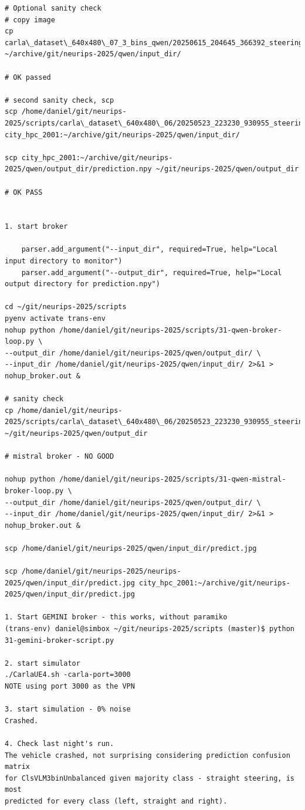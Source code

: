 \begin{verbatim}
# Optional sanity check
# copy image
cp carla\_dataset\_640x480\_07_3_bins_qwen/20250615_204645_366392_steering_0.0000.jpg ~/archive/git/neurips-2025/qwen/input_dir/

# OK passed

# second sanity check, scp
scp /home/daniel/git/neurips-2025/scripts/carla\_dataset\_640x480\_06/20250523_223230_930955_steering_0.0000.jpg city_hpc_2001:~/archive/git/neurips-2025/qwen/input_dir/

scp city_hpc_2001:~/archive/git/neurips-2025/qwen/output_dir/prediction.npy ~/git/neurips-2025/qwen/output_dir

# OK PASS


1. start broker

    parser.add_argument("--input_dir", required=True, help="Local input directory to monitor")
    parser.add_argument("--output_dir", required=True, help="Local output directory for prediction.npy")

cd ~/git/neurips-2025/scripts
pyenv activate trans-env
nohup python /home/daniel/git/neurips-2025/scripts/31-qwen-broker-loop.py \
--output_dir /home/daniel/git/neurips-2025/qwen/output_dir/ \
--input_dir /home/daniel/git/neurips-2025/qwen/input_dir/ 2>&1 > nohup_broker.out &

# sanity check
cp /home/daniel/git/neurips-2025/scripts/carla\_dataset\_640x480\_06/20250523_223230_930955_steering_0.0000.jpg ~/git/neurips-2025/qwen/output_dir

# mistral broker - NO GOOD

nohup python /home/daniel/git/neurips-2025/scripts/31-qwen-mistral-broker-loop.py \
--output_dir /home/daniel/git/neurips-2025/qwen/output_dir/ \
--input_dir /home/daniel/git/neurips-2025/qwen/input_dir/ 2>&1 > nohup_broker.out &

scp /home/daniel/git/neurips-2025/qwen/input_dir/predict.jpg

scp /home/daniel/git/neurips-2025/neurips-2025/qwen/input_dir/predict.jpg city_hpc_2001:~/archive/git/neurips-2025/qwen/input_dir/predict.jpg

1. Start GEMINI broker - this works, without paramiko
(trans-env) daniel@simbox ~/git/neurips-2025/scripts (master)$ python 31-gemini-broker-script.py 

2. start simulator
./CarlaUE4.sh -carla-port=3000
NOTE using port 3000 as the VPN

3. start simulation - 0% noise
Crashed.

4. Check last night's run.
The vehicle crashed, not surprising considering prediction confusion matrix 
for ClsVLM3binUnbalanced given majority class - straight steering, is most
predicted for every class (left, straight and right).


\end{verbatim}
